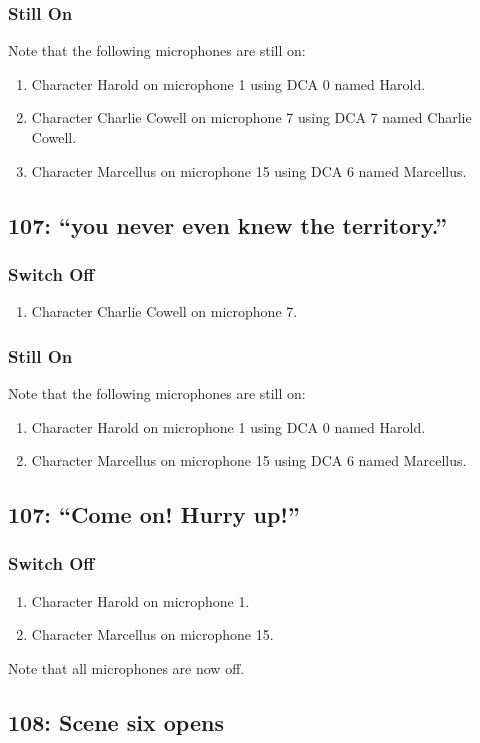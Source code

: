 \subsubsection* {Still On}
Note that the following microphones are still on:
\begin{enumerate}
\item Character Harold on microphone 1 using DCA 0 named Harold.
\item Character Charlie Cowell on microphone 7 using DCA 7 named Charlie Cowell.
\item Character Marcellus on microphone 15 using DCA 6 named Marcellus.
\end{enumerate}
\subsection* {107: ``you never even knew the territory.''}
\subsubsection* {Switch Off}
\begin{enumerate}
\item Character Charlie Cowell on microphone 7.
\end{enumerate}
\subsubsection* {Still On}
Note that the following microphones are still on:
\begin{enumerate}
\item Character Harold on microphone 1 using DCA 0 named Harold.
\item Character Marcellus on microphone 15 using DCA 6 named Marcellus.
\end{enumerate}
\subsection* {107: ``Come on! Hurry up!''}
\subsubsection* {Switch Off}
\begin{enumerate}
\item Character Harold on microphone 1.
\item Character Marcellus on microphone 15.
\end{enumerate}
Note that all microphones are now off.
\subsection* {108: Scene six opens}
